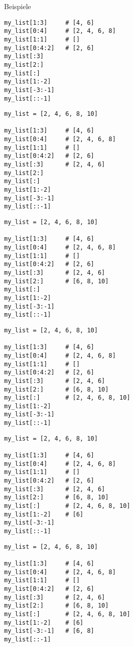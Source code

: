 \begin{fragile}
\begin{exampleblock}{Beispiele}
\begin{overprint}
\begin{verbatim}
my_list[1:3]     # [4, 6]
my_list[0:4]     # [2, 4, 6, 8]
my_list[1:1]     # []
my_list[0:4:2]   # [2, 6]
my_list[:3]      
my_list[2:]      
my_list[:]       
my_list[1:-2]    
my_list[-3:-1]   
my_list[::-1]    
\end{verbatim}

\begin{verbatim}
my_list = [2, 4, 6, 8, 10]

my_list[1:3]     # [4, 6]
my_list[0:4]     # [2, 4, 6, 8]
my_list[1:1]     # []
my_list[0:4:2]   # [2, 6]
my_list[:3]      # [2, 4, 6]
my_list[2:]      
my_list[:]       
my_list[1:-2]   
my_list[-3:-1]   
my_list[::-1]    
\end{verbatim}

\begin{verbatim}
my_list = [2, 4, 6, 8, 10]

my_list[1:3]     # [4, 6]
my_list[0:4]     # [2, 4, 6, 8]
my_list[1:1]     # []
my_list[0:4:2]   # [2, 6]
my_list[:3]      # [2, 4, 6]
my_list[2:]      # [6, 8, 10]
my_list[:]       
my_list[1:-2]    
my_list[-3:-1]  
my_list[::-1]    
\end{verbatim}

\begin{verbatim}
my_list = [2, 4, 6, 8, 10]

my_list[1:3]     # [4, 6]
my_list[0:4]     # [2, 4, 6, 8]
my_list[1:1]     # []
my_list[0:4:2]   # [2, 6]
my_list[:3]      # [2, 4, 6]
my_list[2:]      # [6, 8, 10]
my_list[:]       # [2, 4, 6, 8, 10]
my_list[1:-2]    
my_list[-3:-1]   
my_list[::-1]    
\end{verbatim}

\begin{verbatim}
my_list = [2, 4, 6, 8, 10]

my_list[1:3]     # [4, 6]
my_list[0:4]     # [2, 4, 6, 8]
my_list[1:1]     # []
my_list[0:4:2]   # [2, 6]
my_list[:3]      # [2, 4, 6]
my_list[2:]      # [6, 8, 10]
my_list[:]       # [2, 4, 6, 8, 10]
my_list[1:-2]    # [6]
my_list[-3:-1]    
my_list[::-1]     
\end{verbatim}

\begin{verbatim}
my_list = [2, 4, 6, 8, 10]

my_list[1:3]     # [4, 6]
my_list[0:4]     # [2, 4, 6, 8]
my_list[1:1]     # []
my_list[0:4:2]   # [2, 6]
my_list[:3]      # [2, 4, 6]
my_list[2:]      # [6, 8, 10]
my_list[:]       # [2, 4, 6, 8, 10]
my_list[1:-2]    # [6]
my_list[-3:-1]   # [6, 8] 
my_list[::-1]     
\end{verbatim}


\end{overprint}
\end{exampleblock}
\end{fragile}
